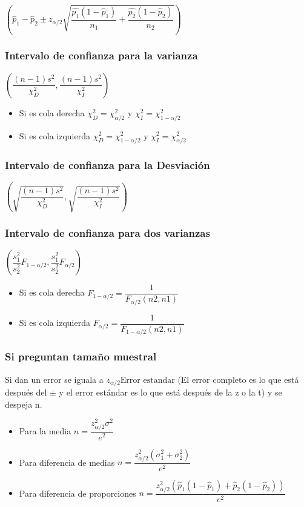 $\left( \hat{p}_1-\hat{p}_2\pm z_{\alpha/2}\sqrt{\dfrac{\hat{p_1}(1-\hat{p}_1)}{n_1}+\dfrac{\hat{p_2}(1-\hat{p}_2)}{n_2}}\right) $

\subsubsection{Intervalo de confianza para la varianza}

$\left( \dfrac{(n-1)s^2}{\chi^2_D},\dfrac{(n-1)s^2}{\chi^2_I}\right) $

\begin{itemize}	
	\item Si es cola derecha $\chi^2_D=\chi^2_{\alpha/2}$ y $\chi^2_I=\chi^2_{1-\alpha/2}$
	\item Si es cola izquierda $\chi^2_D=\chi^2_{1-\alpha/2}$ y $\chi^2_I=\chi^2_{\alpha/2}$
\end{itemize}

\subsubsection{Intervalo de confianza para la Desviación}

$\left( \sqrt{\dfrac{(n-1)s^2}{\chi^2_D}},\sqrt{\dfrac{(n-1)s^2}{\chi^2_I}}\right) $

\subsubsection{Intervalo de confianza para dos varianzas}

$\left( \dfrac{s_1^2}{s_2^2}F_{1-\alpha/2},\dfrac{s_1^2}{s_2^2}F_{\alpha/2}\right) $

\begin{itemize}	
	\item Si es cola derecha $F_{1-\alpha/2}=\dfrac{1}{F_{\alpha/2}(n2,n1)}$
	\item Si es cola izquierda $F_{\alpha/2}=\dfrac{1}{F_{1-\alpha/2}(n2,n1)}$
\end{itemize}

\subsubsection{Si preguntan tamaño muestral}

Si dan un error se iguala a $z_{\alpha/2}\text{Error estandar}$ (El error completo es lo que está después del $\pm$ y el error estándar es lo que está después de la z o la t) y se despeja n.

\begin{itemize}
	\item Para la media $n=\dfrac{z_{\alpha/2}^2\sigma^2}{e^2}$
	\item Para diferencia de medias $n=\dfrac{z_{\alpha/2}^2(\sigma_1^2+\sigma_2^2)}{e^2}$
	\item Para diferencia de proporciones $n=\dfrac{z_{\alpha/2}^2( \hat{p}_1(1-\hat{p}_1)+\hat{p}_2(1-\hat{p}_2)) }{e^2}$
\end{itemize}

